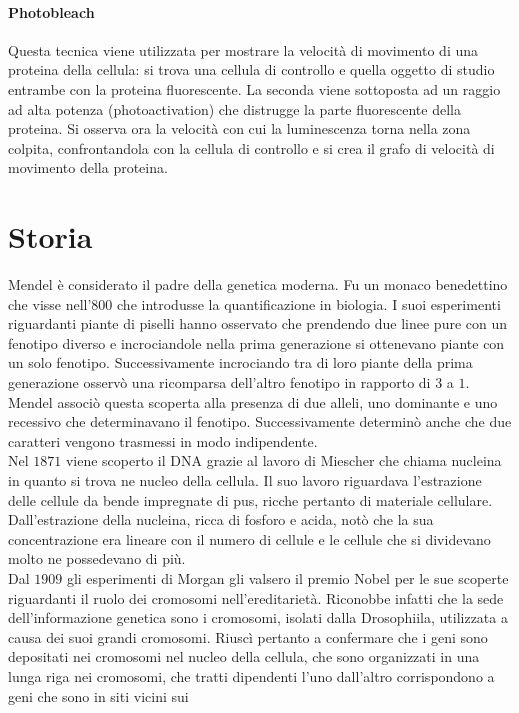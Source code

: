 \paragraph{Photobleach}
Questa tecnica viene utilizzata per mostrare la velocit\`a di movimento di una proteina della cellula: si trova una cellula di controllo e quella oggetto di 
studio entrambe con la proteina fluorescente. La seconda viene sottoposta ad un raggio ad alta potenza (photoactivation) che distrugge la parte fluorescente
della proteina. Si osserva ora la velocit\`a con cui la luminescenza torna nella zona colpita, confrontandola con la cellula di controllo e si crea il grafo
di velocit\`a di movimento della proteina.
\section{Storia}
Mendel \`e considerato il padre della genetica moderna. Fu un monaco benedettino che visse nell'$800$ che introdusse la quantificazione in biologia. I suoi esperimenti riguardanti piante
di piselli hanno osservato che prendendo due linee pure con un fenotipo diverso e incrociandole nella prima generazione si ottenevano piante con un solo fenotipo. Successivamente 
incrociando tra di loro piante della prima generazione osserv\`o una ricomparsa dell'altro fenotipo in rapporto di $3$ a $1$. Mendel associ\`o questa scoperta alla presenza di due 
alleli, uno dominante e uno recessivo che determinavano il fenotipo. Successivamente determin\`o anche che due caratteri vengono trasmessi in modo indipendente. \\
Nel $1871$ viene scoperto il DNA grazie al lavoro di Miescher che chiama nucleina in quanto si trova ne nucleo della cellula. Il suo lavoro riguardava l'estrazione delle cellule da
bende impregnate di pus, ricche pertanto di materiale cellulare. Dall'estrazione della nucleina, ricca di fosforo e acida,  not\`o che la sua concentrazione era lineare con il numero di 
cellule e le cellule che si dividevano molto ne possedevano di pi\`u.\\
Dal $1909$ gli esperimenti di Morgan gli valsero il premio Nobel per le sue scoperte riguardanti il ruolo dei cromosomi nell'ereditariet\`a. Riconobbe infatti che la sede 
dell'informazione genetica sono i cromosomi, isolati dalla Drosophiila, utilizzata a causa dei suoi grandi cromosomi. Riusc\`i pertanto a confermare che i geni sono depositati nei 
cromosomi nel nucleo della cellula, che sono organizzati in una lunga riga nei cromosomi, che tratti dipendenti l'uno dall'altro corrispondono a geni che sono in siti vicini sui 
